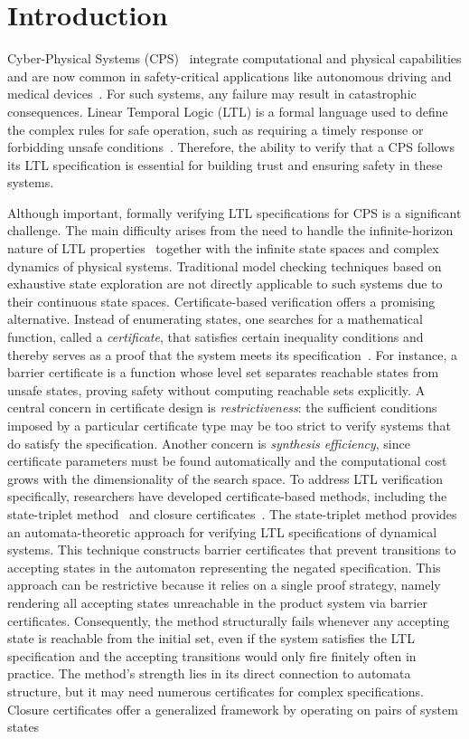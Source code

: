 \section{Introduction}
Cyber-Physical Systems (CPS)~\cite{baheti2011cyber} integrate computational and physical capabilities and are now common in safety-critical applications like autonomous driving and medical devices~\cite{rajkumar2010cyber}. For such systems, any failure may result in catastrophic consequences. Linear Temporal Logic (LTL) is a formal language used to define the complex rules for safe operation, such as requiring a timely response or forbidding unsafe conditions~\cite{pnueli1977temporal}. Therefore, the ability to verify that a CPS follows its LTL specification is essential for building trust and ensuring safety in these systems.

Although important, formally verifying LTL specifications for CPS is a significant challenge. The main difficulty arises from the need to handle the infinite-horizon nature of LTL properties~\cite{baier2008principles} together with the infinite state spaces and complex dynamics of physical systems. Traditional model checking techniques based on exhaustive state exploration are not directly applicable to such systems due to their continuous state spaces. Certificate-based verification offers a promising alternative. Instead of enumerating states, one searches for a mathematical function, called a \emph{certificate}, that satisfies certain inequality conditions and thereby serves as a proof that the system meets its specification~\cite{prajna2004safety}. For instance, a barrier certificate is a function whose level set separates reachable states from unsafe states, proving safety without computing reachable sets explicitly. A central concern in certificate design is \emph{restrictiveness}: the sufficient conditions imposed by a particular certificate type may be too strict to verify systems that do satisfy the specification. Another concern is \emph{synthesis efficiency}, since certificate parameters must be found automatically and the computational cost grows with the dimensionality of the search space. To address LTL verification specifically, researchers have developed certificate-based methods, including the state-triplet method~\cite{wongpiromsarn2015automata} and closure certificates~\cite{murali2024closure}. The state-triplet method provides an automata-theoretic approach for verifying LTL specifications of dynamical systems. This technique constructs barrier certificates that prevent transitions to accepting states in the automaton representing the negated specification. This approach can be restrictive because it relies on a single proof strategy, namely rendering all accepting states unreachable in the product system via barrier certificates. Consequently, the method structurally fails whenever any accepting state is reachable from the initial set, even if the system satisfies the LTL specification and the accepting transitions would only fire finitely often in practice. The method's strength lies in its direct connection to automata structure, but it may need numerous certificates for complex specifications. Closure certificates offer a generalized framework by operating on pairs of system states 